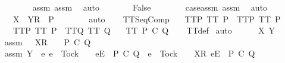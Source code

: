 \begin{isabellebody}
\ \ \ \ \ \ \isamarkupfalse%
\ assm{}\ assm{}\ \isamarkupfalse%
\ auto\isanewline
\ \ \ \ \isamarkupfalse%
\ \isamarkupfalse%
\ {\isachardoublequoteopen}False{\isachardoublequoteclose}\isanewline
\ \ \ \ \ \ \isamarkupfalse%
\ case{\isacharunderscore}assm\ assm{}\ \isamarkupfalse%
\ auto\isanewline
\ \ \ \ \isamarkupfalse%
\ \isamarkupfalse%
\ {\isachardoublequoteopen}{\isasymrho}\ {\isacharat}\ {\isacharbrackleft}{\isacharbrackleft}X\ {\isasymunion}\ Y{\isacharbrackright}\isactrlsub R{\isacharbrackright}\ {\isasymin}\ P{\isachardoublequoteclose}\isanewline
\ \ \ \ \ \ \isamarkupfalse%
\ auto\isanewline
\ \ \isamarkupfalse%
\isanewline
{}\isamarkupfalse%
%
\endisatagproof
{\isafoldproof}%
%
\isadelimproof
\isanewline
%
\endisadelimproof
\isanewline
{}\isamarkupfalse%
\ TT{}{\isacharunderscore}SeqComp{\isacharcolon}\isanewline
\ \ \ TT{}{\isacharunderscore}P{\isacharcolon}\ {\isachardoublequoteopen}TT{}\ P{\isachardoublequoteclose}\ \ TT{}{\isacharunderscore}P{\isacharcolon}\ {\isachardoublequoteopen}TT{}\ P{\isachardoublequoteclose}\isanewline
\ \ \ TT{}{\isacharunderscore}P{\isacharcolon}\ {\isachardoublequoteopen}TT{}\ P{\isachardoublequoteclose}\ \ TT{}{\isacharunderscore}Q{\isacharcolon}\ {\isachardoublequoteopen}TT{}\ Q{\isachardoublequoteclose}\isanewline
\ \ \ {\isachardoublequoteopen}TT{}\ {\isacharparenleft}P\ {\isacharsemicolon}\isactrlsub C\ Q{\isacharparenright}{\isachardoublequoteclose}\isanewline
%
\isadelimproof
\ \ %
\endisadelimproof
%
\isatagproof
{}\isamarkupfalse%
\ TT{}{\isacharunderscore}def\isanewline
{}\isamarkupfalse%
\ auto\isanewline
\ \ \isamarkupfalse%
\ {\isasymrho}\ {\isasymsigma}\ X\ Y\isanewline
\ \ \isamarkupfalse%
\ assm{}{\isacharcolon}\ {\isachardoublequoteopen}{\isasymrho}\ {\isacharat}\ {\isacharbrackleft}X{\isacharbrackright}\isactrlsub R\ {\isacharhash}\ {\isasymsigma}\ {\isasymin}\ P\ {\isacharsemicolon}\isactrlsub C\ Q{\isachardoublequoteclose}\isanewline
\ \ \isamarkupfalse%
\ assm{}{\isacharcolon}\ {\isachardoublequoteopen}Y\ {\isasyminter}\ {\isacharbraceleft}e{\isachardot}\ e\ {\isasymnoteq}\ Tock\ {\isasymand}\ {\isasymrho}\ {\isacharat}\ {\isacharbrackleft}{\isacharbrackleft}e{\isacharbrackright}\isactrlsub E{\isacharbrackright}\ {\isasymin}\ P\ {\isacharsemicolon}\isactrlsub C\ Q\ {\isasymor}\ e\ {\isacharequal}\ Tock\ {\isasymand}\ {\isasymrho}\ {\isacharat}\ {\isacharbrackleft}{\isacharbrackleft}X{\isacharbrackright}\isactrlsub R{\isacharcomma}\ {\isacharbrackleft}e{\isacharbrackright}\isactrlsub E{\isacharbrackright}\ {\isasymin}\ P\ {\isacharsemicolon}\isactrlsub C\ Q{\isacharbraceright}\ {\isacharequal}\ {\isacharbraceleft}{\isacharbraceright}{\isachardoublequoteclose}\isanewline

\end{isabellebody}
